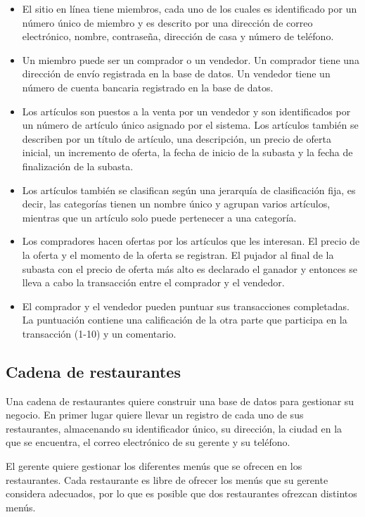 \documentclass{db-practice}
\begin{document}
\begin{itemize}
    \item El sitio en línea tiene miembros, cada uno de los cuales es identificado por un número único de miembro y es descrito por una dirección de correo electrónico, nombre, contraseña, dirección de casa y número de teléfono.
    \item Un miembro puede ser un comprador o un vendedor. Un comprador tiene una dirección de envío registrada en la base de datos. Un vendedor tiene un número de cuenta bancaria registrado en la base de datos.
    \item Los artículos son puestos a la venta por un vendedor y son identificados por un número de artículo único asignado por el sistema. Los artículos también se describen por un título de artículo, una descripción, un precio de oferta inicial, un incremento de oferta, la fecha de inicio de la subasta y la fecha de finalización de la subasta. 
    \item Los artículos también se clasifican según una jerarquía de clasificación fija, es decir, las categorías tienen un nombre único y agrupan varios artículos, mientras que un artículo solo puede pertenecer a una categoría.
    \item Los compradores hacen ofertas por los artículos que les interesan. El precio de la oferta y el momento de la oferta se registran. El pujador al final de la subasta con el precio de oferta más alto es declarado el ganador y entonces se lleva a cabo la transacción entre el comprador y el vendedor.
    \item El comprador y el vendedor pueden puntuar sus transacciones completadas. La puntuación contiene una calificación de la otra parte que participa en la transacción (1-10) y un comentario.
\end{itemize}

\subsection{Cadena de restaurantes}

Una cadena de restaurantes quiere construir una base de datos para gestionar su negocio. En primer lugar quiere llevar un registro de cada uno de sus restaurantes, almacenando su identificador único, su dirección, la ciudad en la que se encuentra, el correo electrónico de su gerente y su teléfono.

El gerente quiere gestionar los diferentes menús que se ofrecen en los restaurantes. Cada restaurante es libre de ofrecer los menús que su gerente considera adecuados, por lo que es posible que dos restaurantes ofrezcan distintos menús.
\end{document}
